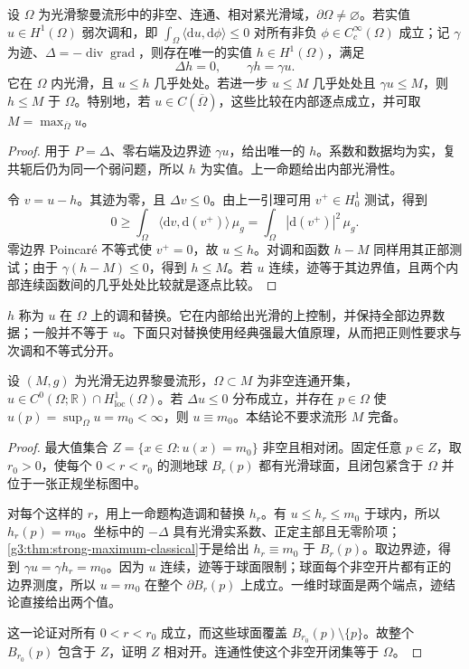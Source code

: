 \begin{proposition}\label{g3:prop:weak-harmonic-replacement}
	设 \(\Omega\) 为光滑黎曼流形中的非空、连通、相对紧光滑域，\(\partial\Omega\ne\varnothing\)。若实值 \(u\in H^1(\Omega)\) 弱次调和，即 \(\int_\Omega\langle\mathrm du,\mathrm d\phi\rangle\le0\) 对所有非负 \(\phi\in C_c^\infty(\Omega)\) 成立；记 \(\gamma\) 为迹、\(\Delta=-\operatorname{div}\operatorname{grad}\)，则存在唯一的实值 \(h\in H^1(\Omega)\)，满足
	\[
		\Delta h=0,\qquad \gamma h=\gamma u.
	\]
	它在 \(\Omega\) 内光滑，且 \(u\le h\) 几乎处处。若进一步 \(u\le M\) 几乎处处且 \(\gamma u\le M\)，则 \(h\le M\) 于 \(\Omega\)。特别地，若 \(u\in C(\overline\Omega)\)，这些比较在内部逐点成立，并可取 \(M=\max_{\overline\Omega}u\)。
\end{proposition}
\begin{proof}
	用于 \(P=\Delta\)、零右端及边界迹 \(\gamma u\)，给出唯一的 \(h\)。系数和数据均为实，复共轭后仍为同一个弱问题，所以 \(h\) 为实值。上一命题给出内部光滑性。

	令 \(v=u-h\)。其迹为零，且 \(\Delta v\le0\)。由上一引理可用 \(v^+\in H^1_0\) 测试，得到
	\[
		0\ge\int_\Omega\langle\mathrm dv,\mathrm d(v^+)\rangle\,\mu_g
		=\int_\Omega|\mathrm d(v^+)|^2\,\mu_g.
	\]
	零边界 Poincaré 不等式使 \(v^+=0\)，故 \(u\le h\)。对调和函数 \(h-M\) 同样用其正部测试；由于 \(\gamma(h-M)\le0\)，得到 \(h\le M\)。若 \(u\) 连续，迹等于其边界值，且两个内部连续函数间的几乎处处比较就是逐点比较。
\end{proof}

\(h\) 称为 \(u\) 在 \(\Omega\) 上的调和替换。它在内部给出光滑的上控制，并保持全部边界数据；一般并不等于 \(u\)。下面只对替换使用经典强最大值原理，从而把正则性要求与次调和不等式分开。

\begin{theorem}\label{g3:thm:weak-subharmonic-strong-maximum}
	设 \((M,g)\) 为光滑无边界黎曼流形，\(\Omega\subset M\) 为非空连通开集，\(u\in C^0(\Omega;\mathbb R)\cap H^1_{\mathrm{loc}}(\Omega)\)。若 \(\Delta u\le0\) 分布成立，并存在 \(p\in\Omega\) 使 \(u(p)=\sup_\Omega u=m_0<\infty\)，则 \(u\equiv m_0\)。本结论不要求流形 \(M\) 完备。
\end{theorem}
\begin{proof}
	最大值集合 \(Z=\{x\in\Omega:u(x)=m_0\}\) 非空且相对闭。固定任意 \(p\in Z\)，取 \(r_0>0\)，使每个 \(0<r<r_0\) 的测地球 \(B_r(p)\) 都有光滑球面，且闭包紧含于 \(\Omega\) 并位于一张正规坐标图中。

	对每个这样的 \(r\)，用上一命题构造调和替换 \(h_r\)。有 \(u\le h_r\le m_0\) 于球内，所以 \(h_r(p)=m_0\)。坐标中的 \(-\Delta\) 具有光滑实系数、正定主部且无零阶项；\cref{g3:thm:strong-maximum-classical}于是给出 \(h_r\equiv m_0\) 于 \(B_r(p)\)。取边界迹，得到 \(\gamma u=\gamma h_r=m_0\)。因为 \(u\) 连续，迹等于球面限制；球面每个非空开片都有正的边界测度，所以 \(u=m_0\) 在整个 \(\partial B_r(p)\) 上成立。一维时球面是两个端点，迹结论直接给出两个值。

	这一论证对所有 \(0<r<r_0\) 成立，而这些球面覆盖 \(B_{r_0}(p)\setminus\{p\}\)。故整个 \(B_{r_0}(p)\) 包含于 \(Z\)，证明 \(Z\) 相对开。连通性使这个非空开闭集等于 \(\Omega\)。
\end{proof}

